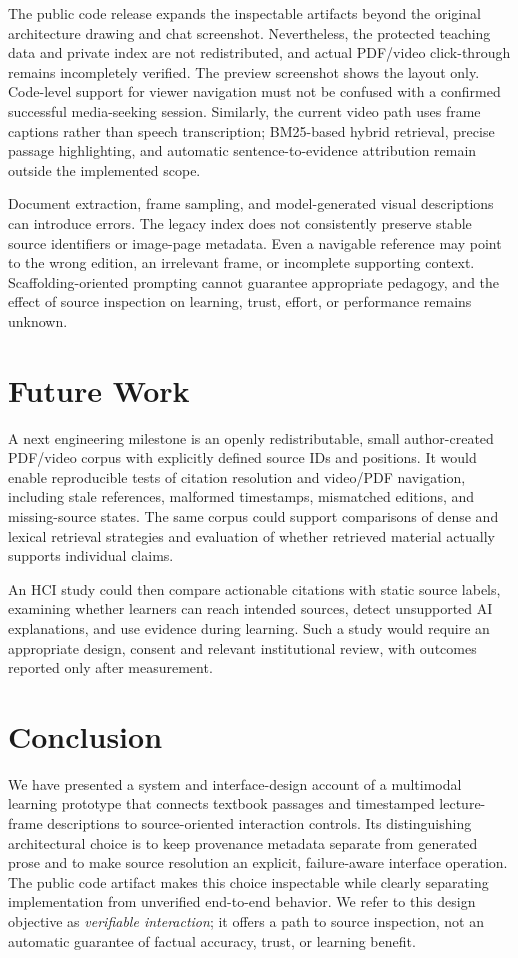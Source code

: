 \documentclass[manuscript,screen,nonacm]{acmart}
\begin{document}
The public code release expands the inspectable artifacts beyond the original architecture drawing and chat screenshot. Nevertheless, the protected teaching data and private index are not redistributed, and actual PDF/video click-through remains incompletely verified. The preview screenshot shows the layout only. Code-level support for viewer navigation must not be confused with a confirmed successful media-seeking session. Similarly, the current video path uses frame captions rather than speech transcription; BM25-based hybrid retrieval, precise passage highlighting, and automatic sentence-to-evidence attribution remain outside the implemented scope.

Document extraction, frame sampling, and model-generated visual descriptions can introduce errors. The legacy index does not consistently preserve stable source identifiers or image-page metadata. Even a navigable reference may point to the wrong edition, an irrelevant frame, or incomplete supporting context. Scaffolding-oriented prompting cannot guarantee appropriate pedagogy, and the effect of source inspection on learning, trust, effort, or performance remains unknown.

\section{Future Work}
A next engineering milestone is an openly redistributable, small author-created PDF/video corpus with explicitly defined source IDs and positions. It would enable reproducible tests of citation resolution and video/PDF navigation, including stale references, malformed timestamps, mismatched editions, and missing-source states. The same corpus could support comparisons of dense and lexical retrieval strategies and evaluation of whether retrieved material actually supports individual claims.

An HCI study could then compare actionable citations with static source labels, examining whether learners can reach intended sources, detect unsupported AI explanations, and use evidence during learning. Such a study would require an appropriate design, consent and relevant institutional review, with outcomes reported only after measurement.

\section{Conclusion}
We have presented a system and interface-design account of a multimodal learning prototype that connects textbook passages and timestamped lecture-frame descriptions to source-oriented interaction controls. Its distinguishing architectural choice is to keep provenance metadata separate from generated prose and to make source resolution an explicit, failure-aware interface operation. The public code artifact makes this choice inspectable while clearly separating implementation from unverified end-to-end behavior. We refer to this design objective as \emph{verifiable interaction}; it offers a path to source inspection, not an automatic guarantee of factual accuracy, trust, or learning benefit.
\end{document}

